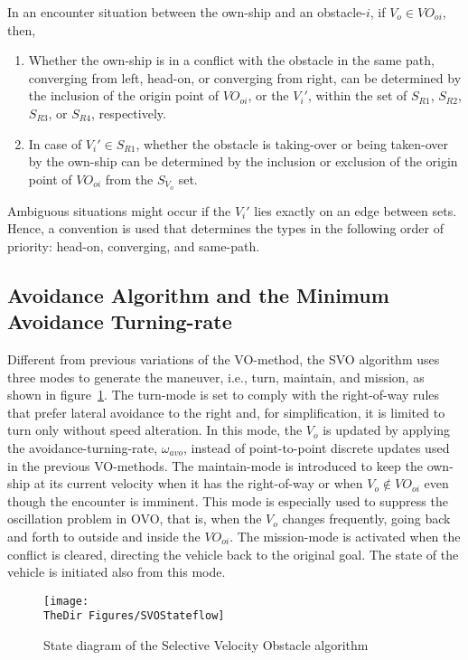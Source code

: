 \begin{Lemma}
In an encounter situation between the own-ship and an obstacle-$i$, if $V_o \in VO_{oi}$, then,
\begin{enumerate}
\item Whether the own-ship is in a conflict with the obstacle in the same path, converging from left, head-on, or converging from right, can be determined by the inclusion of the origin point of $VO_{oi}$, or the $V_i' $, within the set of $S_{R1}$, $S_{R2}$, $S_{R3}$, or $S_{R4}$, respectively.
\item In case of $V_i' \in S_{R1}$, whether the obstacle is taking-over or being taken-over by the own-ship can be determined by the inclusion or exclusion of the origin point of $VO_{oi}$ from the $S_{V_o}$ set.
\end{enumerate}
\end{Lemma}
Ambiguous situations might occur if the $V_i'$ lies exactly on an edge between sets. Hence, a convention is used that determines the types in the following order of priority: head-on, converging, and same-path. 

\subsection{Avoidance Algorithm and the Minimum Avoidance Turning-rate}
Different from previous variations of the VO-method, the SVO algorithm uses three modes to generate the maneuver, i.e., turn, maintain, and mission, as shown in figure~\ref{f:StateFlow}. The turn-mode is set to comply with the right-of-way rules that prefer lateral avoidance to the right and, for simplification, it is limited to turn only without speed alteration. In this mode, the $V_o$ is updated by applying the avoidance-turning-rate, $\omega_{avo}$, instead of point-to-point discrete updates used in the previous VO-methods. The maintain-mode is introduced to keep the own-ship at its current velocity when it has the right-of-way or when $V_o \notin VO_{oi}$ even though the encounter is imminent. This mode is especially used to suppress the oscillation problem in OVO\cite{Snape:11}, that is, when the $V_o$ changes frequently, going back and forth to outside and inside the $VO_{oi}$. The mission-mode is activated when the conflict is cleared, directing the vehicle back to the original goal. The state of the vehicle is initiated also from this mode.

\begin{figure}[h!]
\centering
\texttt{[image: \\TheDir Figures/SVOStateflow]}
 \caption{State diagram of the Selective Velocity Obstacle algorithm}
 \label{f:StateFlow}
\end{figure}

